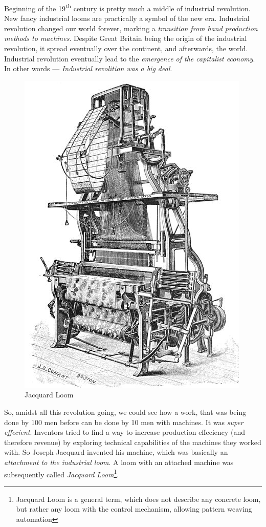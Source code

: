 \documentclass[../../what-is-computer]{subfiles}
\begin{document}
    Beginning of the 19\textsuperscript{th} century is pretty much a middle of industrial revolution. New fancy industrial looms are practically a 
    symbol of the new era. Industrial revolution changed our world forever, marking a \emph{transition from hand production methods to machines}.
    Despite Great Britain being the origin of the industrial revolution, it spread eventually over the continent, and afterwards, the world. 
    Industrial revolution eventually lead to the \emph{emergence of the capitalist economy}. In other words --- \emph{Industrial revolition was a big deal}. \par

    \begin{figure}
        \centering
        \includegraphics[scale=0.2]{images/devices/device_jacquard_loom.jpg}
        \caption{Jacquard Loom}
    \end{figure}

    So, amidst all this revolution going, we could see how a work, that was being done by 100 men before can be done by 10 men with machines. It was \emph{super effecient}.
    Inventors tried to find a way to increase production effeciency (and therefore revenue) by exploring technical capabilities of the machines they worked with. So 
    Joseph Jacquard invented his machine, which was basically an \emph{attachment to the industrial loom}. A loom with an attached machine was subsequently called
    \emph{Jacquard Loom}\footnote{Jacquard Loom is a general term, which does not describe any concrete loom, but rather any loom with the control 
    mechanism, allowing pattern weaving automation}. \par
\end{document}
